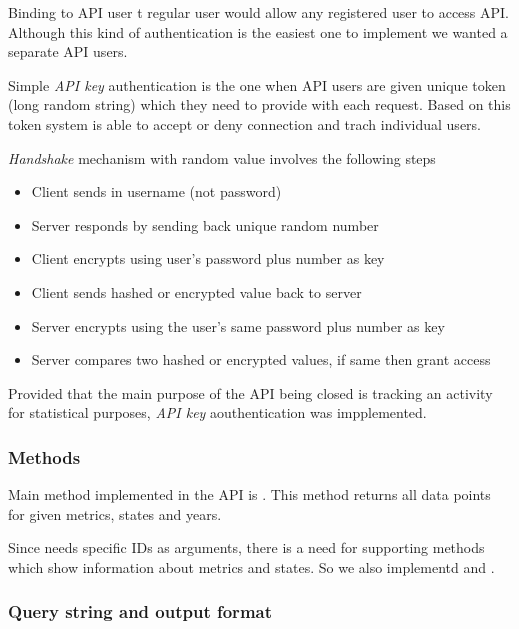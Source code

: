 			Binding to API user t regular user would allow any registered user to access API. Although this kind of authentication is the easiest one to implement we wanted a separate API users.
			
			Simple  \emph{API key} authentication is the one when API users are given unique token (long random string) which they need to provide with each request. Based on this token system is able to accept or deny connection and trach individual users.
			
			\emph{Handshake} mechanism with random value involves the following steps
			
			\begin{itemize}
				\item
					Client sends in username (not password)
				\item
					Server responds by sending back unique random number
				\item
					Client encrypts using user's password plus number as key
				\item
					Client sends hashed or encrypted value back to server
				\item
					Server encrypts using the user's same password plus number as key
				\item
					Server compares two hashed or encrypted values, if same then grant access
			\end{itemize}
			
			Provided that the main purpose of the API being closed is tracking an activity for statistical purposes, \emph{API key} aouthentication was impplemented.

		\subsubsection{Methods}
			
			Main method implemented in the API is . This method returns all data points for given metrics, states and years.
			
			Since  needs specific IDs as arguments, there is a need for supporting methods which show information about metrics and states. So we also implementd  and .

		\subsubsection{Query string and output format}
		
